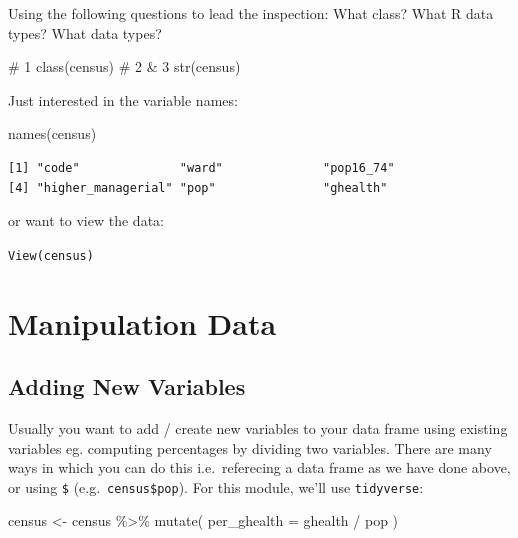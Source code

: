 \documentclass[
  letterpaper,
  DIV=11,
  numbers=noendperiod,
  oneside]{scrreprt}
\newenvironment{Shaded}{\begin{snugshade}}{\end{snugshade}}
\newcommand{\AttributeTok}[1]{\textcolor[rgb]{0.40,0.45,0.13}{#1}}
\newcommand{\CommentTok}[1]{\textcolor[rgb]{0.37,0.37,0.37}{#1}}
\newcommand{\FunctionTok}[1]{\textcolor[rgb]{0.28,0.35,0.67}{#1}}
\newcommand{\NormalTok}[1]{\textcolor[rgb]{0.00,0.23,0.31}{#1}}
\newcommand{\OtherTok}[1]{\textcolor[rgb]{0.00,0.23,0.31}{#1}}
\newcommand{\SpecialCharTok}[1]{\textcolor[rgb]{0.37,0.37,0.37}{#1}}
\begin{document}
Using the following questions to lead the inspection: What class? What R
data types? What data types?

\begin{Shaded}
\begin{Highlighting}[]
\CommentTok{\# 1}
\FunctionTok{class}\NormalTok{(census)}
\CommentTok{\# 2 \& 3}
\FunctionTok{str}\NormalTok{(census)}
\end{Highlighting}
\end{Shaded}

Just interested in the variable names:

\begin{Shaded}
\begin{Highlighting}[]
\FunctionTok{names}\NormalTok{(census)}
\end{Highlighting}
\end{Shaded}

\begin{verbatim}
[1] "code"              "ward"              "pop16_74"         
[4] "higher_managerial" "pop"               "ghealth"          
\end{verbatim}

or want to view the data:

\texttt{View(census)}

\section{Manipulation Data}\label{manipulation-data}

\subsection{Adding New Variables}\label{adding-new-variables}

Usually you want to add / create new variables to your data frame using
existing variables eg. computing percentages by dividing two variables.
There are many ways in which you can do this i.e.~referecing a data
frame as we have done above, or using \texttt{\$}
(e.g.~\texttt{census\$pop}). For this module, we'll use
\texttt{tidyverse}:

\begin{Shaded}
\begin{Highlighting}[]
\NormalTok{census }\OtherTok{\textless{}{-}}\NormalTok{ census }\SpecialCharTok{\%\textgreater{}\%} 
  \FunctionTok{mutate}\NormalTok{( }\AttributeTok{per\_ghealth =}\NormalTok{ ghealth }\SpecialCharTok{/}\NormalTok{ pop )}
\end{Highlighting}
\end{Shaded}
\end{document}

